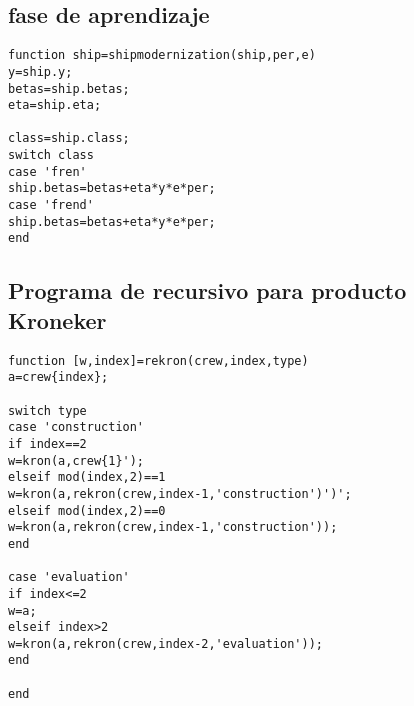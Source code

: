 \subsection{fase de aprendizaje}
\begin{lstlisting}
function ship=shipmodernization(ship,per,e)
y=ship.y;
betas=ship.betas;
eta=ship.eta;

class=ship.class;
switch class
case 'fren'
ship.betas=betas+eta*y*e*per;
case 'frend'
ship.betas=betas+eta*y*e*per;
end
\end{lstlisting}

\subsection{Programa de recursivo para producto \textbf{Kroneker}}
\begin{lstlisting}
function [w,index]=rekron(crew,index,type)
a=crew{index};

switch type
case 'construction'
if index==2
w=kron(a,crew{1}');
elseif mod(index,2)==1
w=kron(a,rekron(crew,index-1,'construction')')';
elseif mod(index,2)==0
w=kron(a,rekron(crew,index-1,'construction'));
end

case 'evaluation'
if index<=2
w=a;
elseif index>2
w=kron(a,rekron(crew,index-2,'evaluation'));
end

end
\end{lstlisting}


